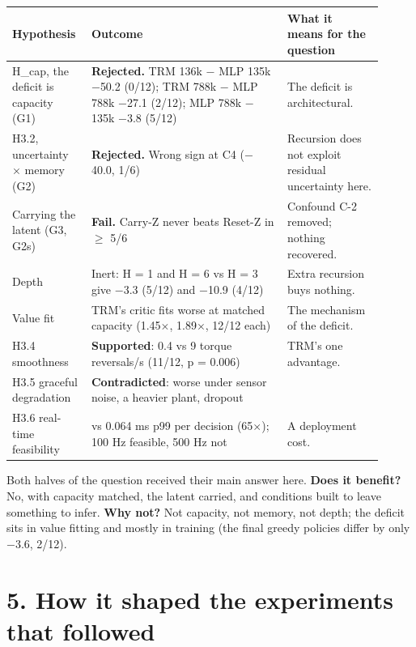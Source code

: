 \documentclass[11pt]{article}
\begin{document}
\begin{center}\small\begin{tabular}{>{\raggedright\arraybackslash}p{0.164\linewidth}>{\raggedright\arraybackslash}p{0.493\linewidth}>{\raggedright\arraybackslash}p{0.249\linewidth}}
\toprule
Hypothesis & Outcome & What it means for the question \\
\midrule
H\_cap, the deficit is capacity (G1) & \textbf{Rejected.} TRM 136k $-$ MLP 135k $-$50.2 (0/12); TRM 788k $-$ MLP 788k $-$27.1 (2/12); MLP 788k $-$ 135k $-$3.8 (5/12) & The deficit is architectural. \\
H3.2, uncertainty $\times$ memory (G2) & \textbf{Rejected.} Wrong sign at C4 ($-$40.0, 1/6) & Recursion does not exploit residual uncertainty here. \\
Carrying the latent (G3, G2s) & \textbf{Fail.} Carry-Z never beats Reset-Z in $\geq$ 5/6 & Confound C-2 removed; nothing recovered. \\
Depth & Inert: H = 1 and H = 6 vs H = 3 give $-$3.3 (5/12) and $-$10.9 (4/12) & Extra recursion buys nothing. \\
Value fit & TRM's critic fits worse at matched capacity (1.45$\times$, 1.89$\times$, 12/12 each) & The mechanism of the deficit. \\
H3.4 smoothness & \textbf{Supported}: 0.4 vs 9 torque reversals/s (11/12, p = 0.006) & TRM's one advantage. \\
H3.5 graceful degradation & \textbf{Contradicted}: worse under sensor noise, a heavier plant, dropout &  \\
H3.6 real-time feasibility & 4.13 vs 0.064 ms p99 per decision (65$\times$); 100 Hz feasible, 500 Hz not & A deployment cost. \\
\bottomrule
\end{tabular}\end{center}



Both halves of the question received their main answer here. \textbf{Does it benefit?} No, with capacity matched, the latent carried, and conditions built to leave something to infer. \textbf{Why not?} Not capacity, not memory, not depth; the deficit sits in value fitting and mostly in training (the final greedy policies differ by only $-$3.6, 2/12).



\section*{5. How it shaped the experiments that followed}
\end{document}
